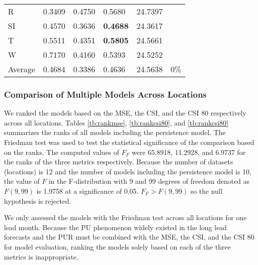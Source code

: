 \documentclass[11pt, a4paper]{article}
\begin{document}
\begin{table}[H]
\begin{tabular}{llllll}
R                                & 0.3409                            & 0.4750                            & 0.5680                               & 24.7397                                     &                                   \\
SI                        & 0.4570                            & 0.3636                            & \textbf{0.4688}                      & 24.3617                                     &                                   \\
T                              & 0.5511                            & 0.4351                            & \textbf{0.5805}                      & 24.5661                                     &                                   \\
W                             & 0.7170                            & 0.4160                            & 0.5393                               & 24.5252                                     &                                   \\ \hline
Average                               & 0.4684                            & 0.3386                            & 0.4636                               & 24.5638                                     & 0\%
\end{tabular}
\end{table}

\subsubsection{Comparison of Multiple Models Across Locations}

We ranked the models based on the MSE, the CSI, and the CSI 80 respectively across all locations. Tables \ref{tb:rankmse}, \ref{tb:rankcsi80}, and \ref{tb:rankcsi80} summarizes the ranks of all models including the persistence model. The Friedman test \citep{friedman1937use,friedman1940comparison,demvsar2006statistical} was used to test the statistical significance of the comparison based on the ranks. The computed values of $F_F$ \citep{demvsar2006statistical} were 65.8918, 11.2928, and 6.9737 for the ranks of the three metrics respectively. Because the number of datasets (locations) is 12 and the number of models including the persistence model is 10, the value of $F$ in the F-distribution with 9 and 99 degrees of freedom denoted as $F(9,99)$ is 1.9758 at a significance of 0.05. $F_F>F(9,99)$ so the null hypothesis is rejected.

We only assessed the models with the Friedman test across all locations for one lead month. Because the PU phenomenon widely existed in the long lead forecasts and the PUR must be combined with the MSE, the CSI, and the CSI 80 for model evaluation, ranking the models solely based on each of the three metrics is inappropriate.
\end{document}
